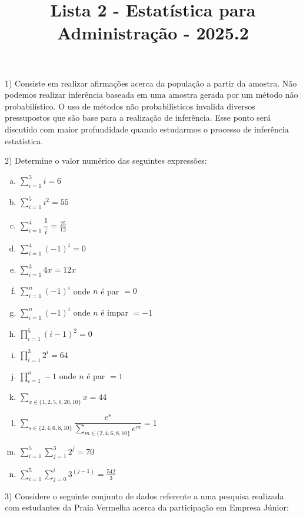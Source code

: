 \documentclass[12pt]{article}
\title{Lista 2 - Estatística para Administração - 2025.2}
\begin{document}
\date{}
\maketitle

1) Consiste em realizar afirmações acerca da população a partir da amostra. 
Não podemos realizar inferência baseada em uma amostra gerada por um método não probabilístico.
O uso de métodos não probabilísticos invalida diversos pressupostos que são base para a realização de inferência. Esse ponto será discutido com maior profundidade quando 
estudarmos o processo de inferência estatística. 
\vspace{5px}

2) Determine o valor numérico das seguintes expressões:

\begin{enumerate}[a)]
    \item $\sum\limits_{i = 1}^3 i = 6$
    \item $\sum\limits_{i = 1}^5 i^2 = 55$
    \item $\sum\limits_{i = 1}^4 \dfrac{1}{i} = \frac{25}{12}$
    \item $\sum\limits_{i = 1}^4 (-1)^{i} = 0$
    \item $\sum\limits_{i = 1}^3 4x = 12x$
    \item $\sum\limits_{i = 1}^n (-1)^{i}$ onde $n$ é par $=0$
    \item $\sum\limits_{i = 1}^n (-1)^{i}$ onde $n$ é ímpar $=-1$
    \item $\prod\limits_{i=1}^5 (i-1)^2 = 0$
    \item $\prod\limits_{i=1}^3 2^i = 64$
    \item $\prod\limits_{i=1}^n -1$ onde $n$ é par $=1$
    \item $\sum\limits_{x \in \{ 1, 2,5,6,20,10\}} x = 44$
    \item $\sum\limits_{s \in \{ 2,4,6,8,10\}}  \dfrac{e^s}{\sum\limits_{m \in \{ 2,4,6,8,10\}} e^m}  = 1$
    \item $\sum\limits_{i=1}^5\sum\limits_{j=1}^3 2^j = 70$
    \item $\sum\limits_{i=1}^5\sum\limits_{j=0}^i 3^{(j-1)} = \frac{542}{3}$
\end{enumerate}
\vspace{5px}

3) Considere o seguinte conjunto de dados referente a uma pesquisa realizada com estudantes da Praia Vermelha acerca da participação em Empresa Júnior:
\end{document}
